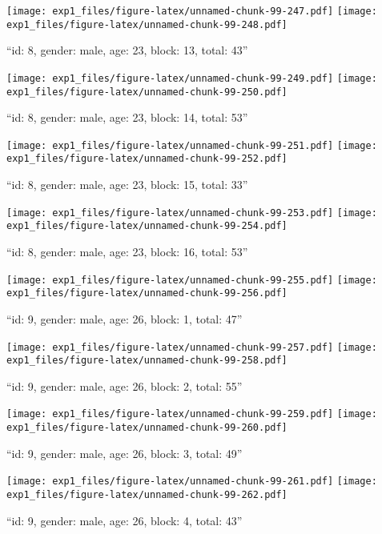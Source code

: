 \documentclass[,]{article}
\begin{document}
\texttt{[image: exp1\_files/figure-latex/unnamed-chunk-99-247.pdf]}
\texttt{[image: exp1\_files/figure-latex/unnamed-chunk-99-248.pdf]}

\newpage
[1] 

``id: 8, gender: male, age: 23, block: 13, total: 43''

\texttt{[image: exp1\_files/figure-latex/unnamed-chunk-99-249.pdf]}
\texttt{[image: exp1\_files/figure-latex/unnamed-chunk-99-250.pdf]}

\newpage
[1] 

``id: 8, gender: male, age: 23, block: 14, total: 53''

\texttt{[image: exp1\_files/figure-latex/unnamed-chunk-99-251.pdf]}
\texttt{[image: exp1\_files/figure-latex/unnamed-chunk-99-252.pdf]}

\newpage
[1] 

``id: 8, gender: male, age: 23, block: 15, total: 33''

\texttt{[image: exp1\_files/figure-latex/unnamed-chunk-99-253.pdf]}
\texttt{[image: exp1\_files/figure-latex/unnamed-chunk-99-254.pdf]}

\newpage
[1] 

``id: 8, gender: male, age: 23, block: 16, total: 53''

\texttt{[image: exp1\_files/figure-latex/unnamed-chunk-99-255.pdf]}
\texttt{[image: exp1\_files/figure-latex/unnamed-chunk-99-256.pdf]}

\newpage
[1] 

``id: 9, gender: male, age: 26, block: 1, total: 47''

\texttt{[image: exp1\_files/figure-latex/unnamed-chunk-99-257.pdf]}
\texttt{[image: exp1\_files/figure-latex/unnamed-chunk-99-258.pdf]}

\newpage
[1] 

``id: 9, gender: male, age: 26, block: 2, total: 55''

\texttt{[image: exp1\_files/figure-latex/unnamed-chunk-99-259.pdf]}
\texttt{[image: exp1\_files/figure-latex/unnamed-chunk-99-260.pdf]}

\newpage
[1] 

``id: 9, gender: male, age: 26, block: 3, total: 49''

\texttt{[image: exp1\_files/figure-latex/unnamed-chunk-99-261.pdf]}
\texttt{[image: exp1\_files/figure-latex/unnamed-chunk-99-262.pdf]}

\newpage
[1] 

``id: 9, gender: male, age: 26, block: 4, total: 43''
\end{document}
